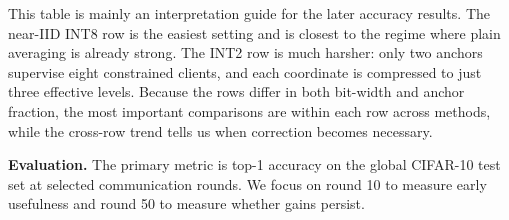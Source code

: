 This table is mainly an interpretation guide for the later accuracy results.
The near-IID INT8 row is the easiest setting and is closest to the regime where
plain averaging is already strong. The INT2 row is much harsher: only two
anchors supervise eight constrained clients, and each coordinate is compressed
to just three effective levels. Because the rows differ in both bit-width and
anchor fraction, the most important comparisons are within each row across
methods, while the cross-row trend tells us when correction becomes necessary.

\textbf{Evaluation.}
The primary metric is top-1 accuracy on the global CIFAR-10 test set at
selected communication rounds. We focus on round 10 to measure early usefulness
and round 50 to measure whether gains persist.
